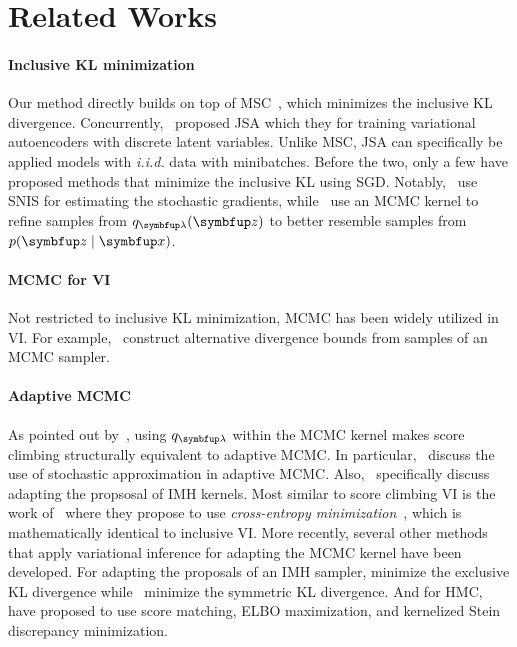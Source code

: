 \vspace{-0.05in}
\section{Related Works}\label{section:related}
\vspace{-0.05in}
\paragraph{Inclusive KL minimization}
Our method directly builds on top of MSC~\citep{NEURIPS2020_b2070693}, which minimizes the inclusive KL divergence.
Concurrently,~\citet{pmlr-v124-ou20a} proposed JSA which they for training variational autoencoders with discrete latent variables.
Unlike MSC, JSA can specifically be applied models with \textit{i.i.d.} data with minibatches.
Before the two, only a few have proposed methods that minimize the inclusive KL using SGD.
Notably,~\citet{DBLP:journals/corr/BornscheinB14} use SNIS for estimating the stochastic gradients, while~\citet{li_approximate_2017} use an MCMC kernel to refine samples from \(q_{\vlambda}(\vz)\) to better resemble samples from \(p(\vz\mid\vx)\).

\vspace{-0.1in}
\paragraph{MCMC for VI}
Not restricted to inclusive KL minimization, MCMC has been widely utilized in VI.
For example,~\citet{pmlr-v37-salimans15, pmlr-v97-ruiz19a} construct alternative divergence bounds from samples of an MCMC sampler.

\vspace{-0.1in}
\paragraph{Adaptive MCMC}
As pointed out by~\citet{pmlr-v124-ou20a}, using \(q_{\vlambda}\) within the MCMC kernel makes score climbing structurally equivalent to adaptive MCMC.
In particular,~\citet{10.1007/s11222-008-9110-y, garthwaite_adaptive_2016} discuss the use of stochastic approximation in adaptive MCMC.
Also,~\citet{andrieu_ergodicity_2006, keith_adaptive_2008, holden_adaptive_2009, giordani_adaptive_2010} specifically discuss adapting the propsosal of IMH kernels.
Most similar to score climbing VI is the work of~\citet{keith_adaptive_2008} where they propose to use \textit{cross-entropy minimization}~\citep{barbakh_cross_2009}, which is mathematically identical to inclusive VI.
More recently, several other methods that apply variational inference for adapting the MCMC kernel have been developed.
For adapting the proposals of an IMH sampler, \citet{habib2018auxiliary} minimize the exclusive KL divergence while~\cite{neklyudov_metropolishastings_2019} minimize the symmetric KL divergence.
And for HMC,~\citet{zhang_variational_2018, pmlr-v139-campbell21a} have proposed to use score matching, ELBO maximization, and kernelized Stein discrepancy minimization.

